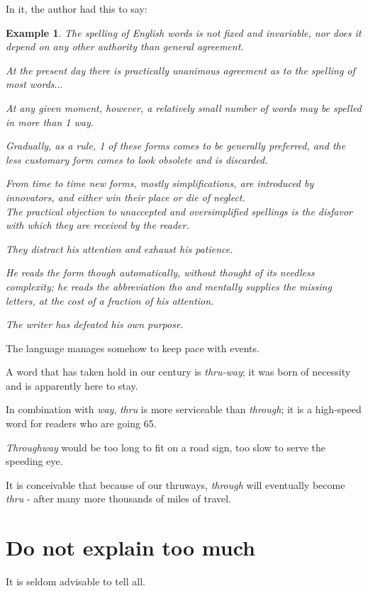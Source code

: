 \documentclass{book}
\numberwithin{equation}{section}
\newtheorem{example}{Example}[chapter]
\begin{document}
In it, the author had this to say:
\begin{example}
    The spelling of English words is not fixed and invariable, nor does it depend on any other authority than general agreement.
    
    At the present day there is practically unanimous agreement as to the spelling of most words$\ldots$
    
    At any given moment, however, a relatively small number of words may be spelled in more than 1 way.
    
    Gradually, as a rule, 1 of these forms comes to be generally preferred, and the less customary form comes to look obsolete and is discarded.
    
    From time to time new forms, mostly simplifications, are introduced by innovators, and either win their place or die of neglect.
    \\
    
    The practical objection to unaccepted and oversimplified spellings is the disfavor with which they are received by the reader.
    
    They distract his attention and exhaust his patience.
    
    He reads the form though automatically, without thought of its needless complexity; he reads the abbreviation tho and mentally supplies the missing letters, at the cost of a fraction of his attention.
    
    The writer has defeated his own purpose.
\end{example}
The language manages somehow to keep pace with events.

A word that has taken hold in our century is \textit{thru-way}; it was born of necessity and is apparently here to stay.

In combination with \textit{way}, \textit{thru} is more serviceable than \textit{through}; it is a high-speed word for readers who are going 65.

\textit{Throughway} would be too long to fit on a road sign, too slow to serve the speeding eye.

It is conceivable that because of our thruways, \textit{through} will eventually become \textit{thru} - after many more thousands of miles of travel.

\section{Do not explain too much}
It is seldom advisable to tell all.
\end{document}
